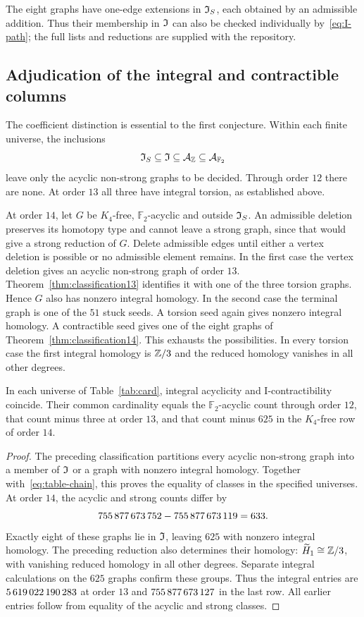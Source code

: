 The eight graphs have one-edge extensions in $\mathfrak I_S$, each obtained by
an admissible addition. Thus their membership in $\mathfrak I$ can also be
checked individually by~\eqref{eq:I-path}; the full lists and
reductions are supplied with the repository.

\subsection{Adjudication of the integral and contractible columns}

The coefficient distinction is essential to the first conjecture.
Within each finite universe, the inclusions
\begin{equation}\label{eq:table-chain}
 \mathfrak I_S\subseteq\mathfrak I\subseteq\mathcal A_{\mathbb Z}
       \subseteq\mathcal A_{\mathbb F_2}
\end{equation}
leave only the acyclic non-strong graphs to be decided. Through
order $12$ there are none. At order $13$ all three have integral
torsion, as established above.

At order $14$, let $G$ be $K_4$-free, $\mathbb F_2$-acyclic and
outside $\mathfrak I_S$. An admissible deletion preserves its homotopy type
and cannot leave a strong graph, since that would give a strong
reduction of $G$. Delete admissible edges until either a vertex
deletion is possible or no admissible element remains. In the first
case the vertex deletion gives an acyclic non-strong graph of order
$13$. Theorem~\ref{thm:classification13} identifies it with one of
the three torsion graphs. Hence $G$ also has nonzero integral homology.
In the second case the terminal graph is one of the $51$ stuck seeds.
A torsion seed again gives nonzero integral homology. A contractible
seed gives one of the eight graphs of
Theorem~\ref{thm:classification14}. This exhausts the possibilities.
In every torsion case the first integral homology is $\mathbb Z/3$ and
the reduced homology vanishes in all other degrees.

\begin{proposition}\label{prop:table-integral}
In each universe of Table~\ref{tab:card}, integral acyclicity and
I-contractibility coincide. Their common cardinality equals the
$\mathbb F_2$-acyclic count through order $12$, that count minus
three at order $13$, and that count minus $625$ in the $K_4$-free
row of order $14$.
\end{proposition}
\begin{proof}
The preceding classification partitions every acyclic non-strong
graph into a member of $\mathfrak I$ or a graph with nonzero integral
homology. Together with~\eqref{eq:table-chain}, this proves the
equality of classes in the specified universes. At order $14$,
the acyclic and strong counts differ by
\[
 \num{755877673752}-\num{755877673119}=633.
\]
Exactly eight of these graphs lie in $\mathfrak I$, leaving $625$ with
nonzero integral homology. The preceding reduction also determines their homology:
$\widetilde H_1\cong\mathbb Z/3$, with vanishing reduced homology in
all other degrees. Separate integral calculations on the $625$
graphs confirm these groups. Thus the integral entries are
$\num{5619022190283}$ at order $13$ and $\num{755877673127}$ in the last
row. All earlier entries follow from equality of the acyclic and
strong classes.
\end{proof}

